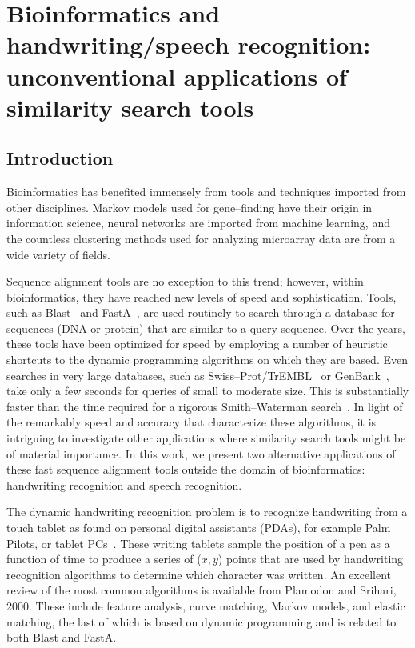 \chapter{Bioinformatics and handwriting/speech recognition: unconventional applications of similarity search tools}
\section{Introduction}
	Bioinformatics has benefited immensely from tools and techniques imported
	from other disciplines.  Markov models used for gene--finding have
	their origin in information science, neural networks are imported
	from machine learning, and the countless clustering methods used
	for analyzing microarray data are from a wide variety of fields.

	Sequence alignment tools are no exception to this trend;
	however, within bioinformatics, they have reached
	new levels of speed and sophistication.  Tools,
	such as Blast~\cite{altschul1990basic,altschul1997gapped}
	and FastA~\cite{pearson1998improved}, are used routinely to search
	through a database for sequences (DNA or protein) that are
	similar to a query sequence.  Over the years, these tools have
	been optimized for speed by employing a number of heuristic
	shortcuts to the dynamic programming algorithms on which
	they are based.  Even searches in very large databases,
	such as Swiss--Prot/TrEMBL~\cite{bairoch2000swiss-prot} or
	GenBank~\cite{benson2000genbank}, take only a few seconds
	for queries of small to moderate size.	This is substantially
	faster than the time required for a rigorous Smith--Waterman
	search~\cite{waterman1984efficient}.  In light of the remarkably
	speed and accuracy that characterize these algorithms, it is 
	intriguing to investigate other applications where similarity
	search tools might be of material importance.  In this work, we present two
	alternative applications of these fast sequence alignment tools
	outside the domain of bioinformatics: handwriting recognition and
	speech recognition.

	The dynamic handwriting recognition problem is to recognize
	handwriting from a touch tablet as found on personal
	digital assistants (PDAs), for example Palm Pilots, or tablet
	PCs~\cite{tappert1990thestate}.  These writing tablets sample
	the position of a pen as a function of time to produce a series of
	($x,y$) points that are used by handwriting recognition algorithms to
	determine which character was written.	An excellent review of the
	most common algorithms is available from Plamodon and Srihari, 2000.
	These include feature analysis, curve matching, Markov models, and
	elastic matching, the last of which is based on dynamic programming
	and is related to both Blast and FastA.

